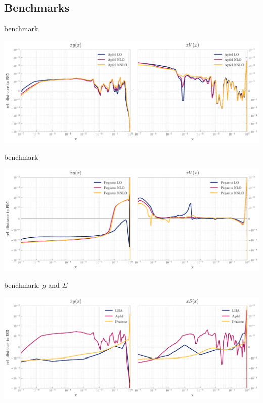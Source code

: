 \documentclass[9pt]{beamer}
\begin{document}
\subsection{Benchmarks}
\begin{frame}{\eko{} \apfel{} benchmark}
	\begin{center}
		\includegraphics[width=\linewidth]{Apfel_bench_pto.pdf}
	\end{center}
\end{frame}
\begin{frame}{\eko{} \pegasus{} benchmark}
	\begin{center}
		\includegraphics[width=\linewidth]{Pegasus_bench_pto.pdf}
	\end{center}
\end{frame}
\begin{frame}{\eko{} \lha{} benchmark: $g$ and $\Sigma$}
	\begin{center}
		\includegraphics[width=\linewidth]{lha_bench_g_S.pdf}
	\end{center}
\end{frame}
\end{document}
